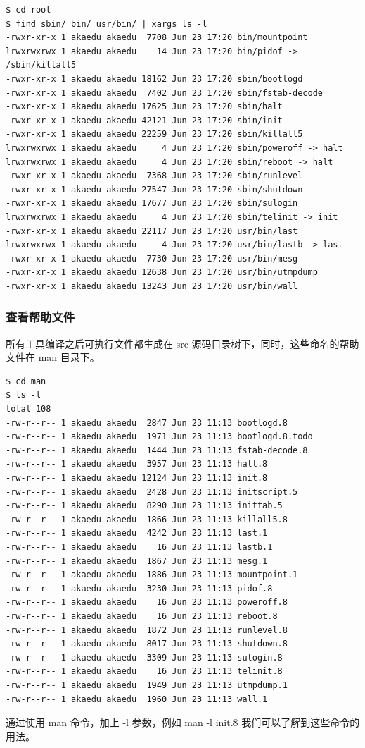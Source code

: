 {\begin{shaded}\begin{verbatim}
$ cd root
$ find sbin/ bin/ usr/bin/ | xargs ls -l
-rwxr-xr-x 1 akaedu akaedu  7708 Jun 23 17:20 bin/mountpoint
lrwxrwxrwx 1 akaedu akaedu    14 Jun 23 17:20 bin/pidof -> /sbin/killall5
-rwxr-xr-x 1 akaedu akaedu 18162 Jun 23 17:20 sbin/bootlogd
-rwxr-xr-x 1 akaedu akaedu  7402 Jun 23 17:20 sbin/fstab-decode
-rwxr-xr-x 1 akaedu akaedu 17625 Jun 23 17:20 sbin/halt
-rwxr-xr-x 1 akaedu akaedu 42121 Jun 23 17:20 sbin/init
-rwxr-xr-x 1 akaedu akaedu 22259 Jun 23 17:20 sbin/killall5
lrwxrwxrwx 1 akaedu akaedu     4 Jun 23 17:20 sbin/poweroff -> halt
lrwxrwxrwx 1 akaedu akaedu     4 Jun 23 17:20 sbin/reboot -> halt
-rwxr-xr-x 1 akaedu akaedu  7368 Jun 23 17:20 sbin/runlevel
-rwxr-xr-x 1 akaedu akaedu 27547 Jun 23 17:20 sbin/shutdown
-rwxr-xr-x 1 akaedu akaedu 17677 Jun 23 17:20 sbin/sulogin
lrwxrwxrwx 1 akaedu akaedu     4 Jun 23 17:20 sbin/telinit -> init
-rwxr-xr-x 1 akaedu akaedu 22117 Jun 23 17:20 usr/bin/last
lrwxrwxrwx 1 akaedu akaedu     4 Jun 23 17:20 usr/bin/lastb -> last
-rwxr-xr-x 1 akaedu akaedu  7730 Jun 23 17:20 usr/bin/mesg
-rwxr-xr-x 1 akaedu akaedu 12638 Jun 23 17:20 usr/bin/utmpdump
-rwxr-xr-x 1 akaedu akaedu 13243 Jun 23 17:20 usr/bin/wall
\end{verbatim}\end{shaded}}
\subsubsection{查看帮助文件}

所有工具编译之后可执行文件都生成在 src
源码目录树下，同时，这些命名的帮助文件在 man 目录下。

{\begin{shaded}\begin{verbatim}
$ cd man
$ ls -l
total 108
-rw-r--r-- 1 akaedu akaedu  2847 Jun 23 11:13 bootlogd.8
-rw-r--r-- 1 akaedu akaedu  1971 Jun 23 11:13 bootlogd.8.todo
-rw-r--r-- 1 akaedu akaedu  1444 Jun 23 11:13 fstab-decode.8
-rw-r--r-- 1 akaedu akaedu  3957 Jun 23 11:13 halt.8
-rw-r--r-- 1 akaedu akaedu 12124 Jun 23 11:13 init.8
-rw-r--r-- 1 akaedu akaedu  2428 Jun 23 11:13 initscript.5
-rw-r--r-- 1 akaedu akaedu  8290 Jun 23 11:13 inittab.5
-rw-r--r-- 1 akaedu akaedu  1866 Jun 23 11:13 killall5.8
-rw-r--r-- 1 akaedu akaedu  4242 Jun 23 11:13 last.1
-rw-r--r-- 1 akaedu akaedu    16 Jun 23 11:13 lastb.1
-rw-r--r-- 1 akaedu akaedu  1867 Jun 23 11:13 mesg.1
-rw-r--r-- 1 akaedu akaedu  1886 Jun 23 11:13 mountpoint.1
-rw-r--r-- 1 akaedu akaedu  3230 Jun 23 11:13 pidof.8
-rw-r--r-- 1 akaedu akaedu    16 Jun 23 11:13 poweroff.8
-rw-r--r-- 1 akaedu akaedu    16 Jun 23 11:13 reboot.8
-rw-r--r-- 1 akaedu akaedu  1872 Jun 23 11:13 runlevel.8
-rw-r--r-- 1 akaedu akaedu  8017 Jun 23 11:13 shutdown.8
-rw-r--r-- 1 akaedu akaedu  3309 Jun 23 11:13 sulogin.8
-rw-r--r-- 1 akaedu akaedu    16 Jun 23 11:13 telinit.8
-rw-r--r-- 1 akaedu akaedu  1949 Jun 23 11:13 utmpdump.1
-rw-r--r-- 1 akaedu akaedu  1960 Jun 23 11:13 wall.1
\end{verbatim}\end{shaded}}
通过使用 man 命令，加上 -l 参数，例如 man -l init.8
我们可以了解到这些命令的用法。

